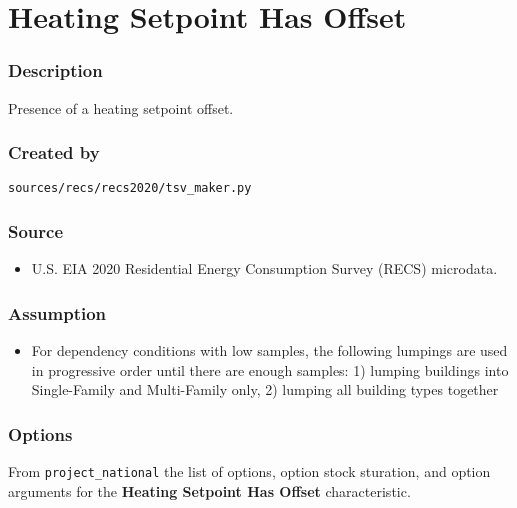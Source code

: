 \section{Heating Setpoint Has
Offset}\label{heating_setpoint_has_offset}

\subsubsection{Description}\label{description-88}

Presence of a heating setpoint offset.

\subsubsection{Created by}\label{created-by-88}

\texttt{sources/recs/recs2020/tsv\_maker.py}

\subsubsection{Source}\label{source-87}

\begin{itemize}
 
\item
  U.S. EIA 2020 Residential Energy Consumption Survey (RECS) microdata.
\end{itemize}

\subsubsection{Assumption}\label{assumption-52}

\begin{itemize}
 
\item
  For dependency conditions with low samples, the following lumpings are
  used in progressive order until there are enough samples: 1) lumping
  buildings into Single-Family and Multi-Family only, 2) lumping all
  building types together
\end{itemize}

\subsubsection{Options}\label{options-88}

From \texttt{project\_national} the list of options, option stock
sturation, and option arguments for the \textbf{Heating Setpoint Has
Offset} characteristic.

